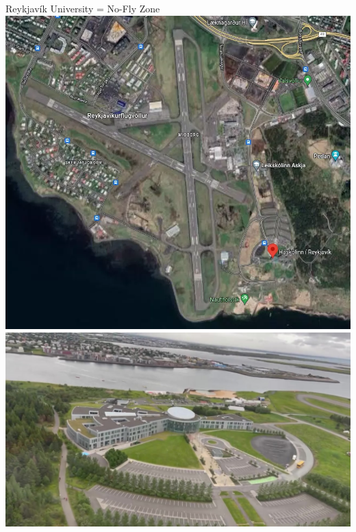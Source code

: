 \documentclass[aspectratio=169]{beamer}
\begin{document}

\begin{frame}{Reykjavík University = No-Fly Zone}
	\centering
	\includegraphics[height=0.6\textheight]{./images/reykjavik_university_no_fly_zone}
	\includegraphics[height=0.6\textheight]{./images/ru_aerial.jpg}
\end{frame}
\end{document}
